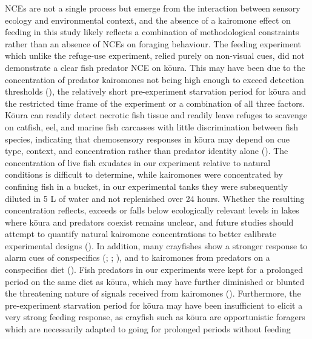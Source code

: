 \documentclass[
  letterpaper,
  DIV=11,
  numbers=noendperiod]{scrartcl}
\begin{document}
NCEs are not a single process but emerge from the interaction between
sensory ecology and environmental context, and the absence of a
kairomone effect on feeding in this study likely reflects a combination
of methodological constraints rather than an absence of NCEs on foraging
behaviour. The feeding experiment which unlike the refuge-use
experiment, relied purely on non-visual cues, did not demonstrate a
clear fish predator NCE on kōura. This may have been due to the
concentration of predator kairomones not being high enough to exceed
detection thresholds (), the relatively short pre-experiment starvation period for kōura
and the restricted time frame of the experiment or a combination of all
three factors. Kōura can readily detect necrotic fish tissue and readily
leave refuges to scavenge on catfish, eel, and marine fish carcasses
with little discrimination between fish species, indicating that
chemosensory responses in kōura may depend on cue type, context, and
concentration rather than predator identity alone
(). The concentration of
live fish exudates in our experiment relative to natural conditions is
difficult to determine, while kairomones were concentrated by confining
fish in a bucket, in our experimental tanks they were subsequently
diluted in 5 L of water and not replenished over 24 hours. Whether the
resulting concentration reflects, exceeds or falls below ecologically
relevant levels in lakes where kōura and predators coexist remains
unclear, and future studies should attempt to quantify natural kairomone
concentrations to better calibrate experimental designs
(). In addition,
many crayfishes show a stronger response to alarm cues of conspecifics
(;
;
), and to kairomones
from predators on a conspecifics diet
(). Fish predators in
our experiments were kept for a prolonged period on the same diet as
kōura, which may have further diminished or blunted the threatening
nature of signals received from kairomones (). Furthermore, the pre-experiment starvation period
for kōura may have been insufficient to elicit a very strong feeding
response, as crayfish such as kōura are opportunistic foragers which are
necessarily adapted to going for prolonged periods without feeding
\end{document}
